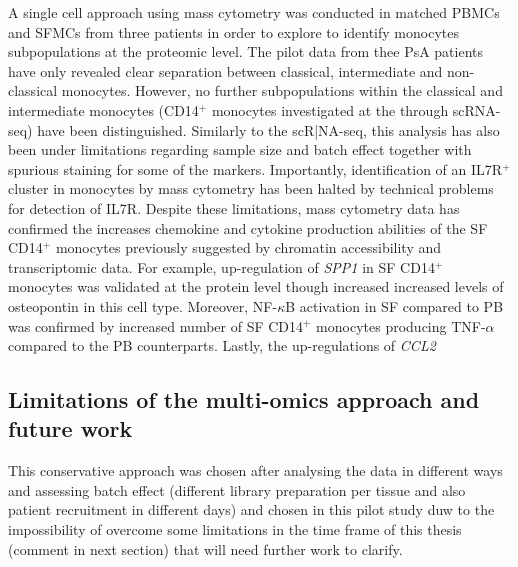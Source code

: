 A single cell approach using mass cytometry was conducted in matched PBMCs and SFMCs from three patients in order to explore to identify monocytes subpopulations at the proteomic level. The pilot data from thee PsA patients have only revealed clear separation between classical, intermediate and non-classical monocytes. However, no further subpopulations within the classical and intermediate monocytes (CD14$^+$ monocytes investigated at the through scRNA-seq) have been distinguished. Similarly to the scR|NA-seq, this analysis has also been under limitations regarding sample size and batch effect together with spurious staining for some of the markers. Importantly, identification of an IL7R$^+$ cluster in monocytes by mass cytometry has been halted by technical problems for detection of IL7R. Despite these limitations, mass cytometry data has confirmed the increases chemokine and cytokine production abilities of the SF CD14$^+$ monocytes previously suggested by chromatin accessibility and transcriptomic data. For example, up-regulation of \textit{SPP1} in SF CD14$^+$ monocytes was validated at the protein level though increased increased levels of osteopontin in this cell type. Moreover, NF-$\kappa$B activation in SF compared to PB was confirmed by increased number of SF CD14$^+$ monocytes producing TNF-$\alpha$ compared to the PB counterparts. Lastly, the up-regulations of \textit{CCL2}











\subsection{Limitations of the multi-omics approach and future work}
\label{Discussion_scRNAseq}

This conservative approach was chosen after analysing the data in different ways and assessing batch effect (different library preparation per tissue and also patient recruitment in different days) and chosen in this pilot study duw to the impossibility of overcome some limitations in the time frame of this thesis (comment in next section) that will need further work to clarify.




